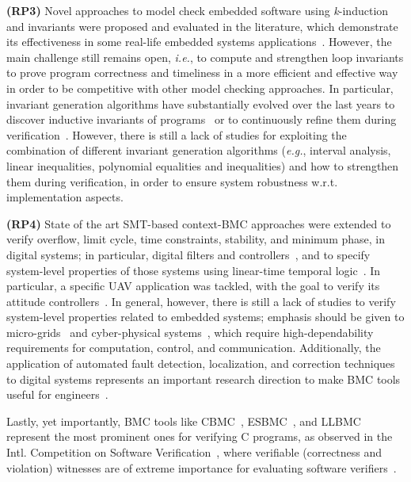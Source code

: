 \documentclass{acm_sen_article}
\begin{document}
\textbf{(RP3)} Novel approaches to model check embedded software using \textit{k}-induction and invariants were proposed and evaluated in the literature, which demonstrate its effectiveness in some real-life embedded systems applications~\cite{Gadelha15,Rocha15,Brain15}. However, the main challenge still remains open, {\it i.e.}, to compute and strengthen loop invariants to prove program correctness and timeliness in a more efficient and effective way in order to be competitive with other model checking approaches. In particular, invariant generation algorithms have substantially evolved over the last years to discover inductive invariants of programs~\cite{pips:2013,Henry:2012} or to continuously refine them during verification~\cite{Beyer15}. However, there is still a lack of studies for exploiting the combination of different invariant generation algorithms ({\it e.g.}, interval analysis, linear inequalities, polynomial equalities and inequalities) and how to strengthen them during verification, in order to ensure system robustness w.r.t. implementation aspects.

\textbf{(RP4)} State of the art SMT-based context-BMC approaches were extended to verify overflow, limit cycle, time constraints, stability, and minimum phase, in digital systems; in particular, digital filters and controllers~\cite{dsv_spin2015,esbmc_controller,esbmc_filter}, and to specify system-level properties of those systems using linear-time temporal logic~\cite{JMorse15}. In particular, a specific UAV application was tackled, with the goal to verify its attitude controllers~\cite{Bessa16}. In general, however, there is still a lack of studies to verify system-level properties related to embedded systems; emphasis should be given to micro-grids~\cite{xu15} and cyber-physical systems~\cite{leeCPS2}, which require high-dependability requirements for computation, control, and communication. Additionally, the application of automated fault detection, localization, and correction techniques to digital systems represents an important research direction to make BMC tools useful for engineers~\cite{Alves15}.

Lastly, yet importantly, BMC tools like CBMC~\cite{Clarke04}, ESBMC~\cite{MorseCNF13,MorseRCN014}, and LLBMC~\cite{MerzFS12} represent the most prominent ones for verifying C programs, as observed in the Intl. Competition on Software Verification~\cite{Beyer14,BeyerSVCOMP15}, where verifiable (correctness and violation) witnesses are of extreme importance for evaluating software verifiers~\cite{BeyerW15,RochaIFM12}.
\end{document}
